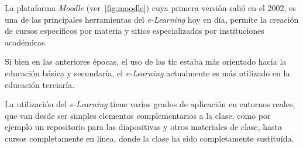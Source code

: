 La plataforma \emph{Moodle} (ver~\ref{fig:moodle}) cuya primera versión salió en
el 2002, es una de las principales herramientas del \emph{e-Learning} hoy en
día, permite la creación de cursos específicos por materia y sitios
especializados por instituciones académicas\cite{perkins2006using}. 

Si bien en las anteriores épocas, el uso de las \Gls{tic} estaba más orientado
hacia la educación básica y secundaría, el \emph{e-Learning} actualmente es más
utilizado en la educación terciaría\cite{punie:ict}.

La utilización del \emph{e-Learning} tiene varios grados de aplicación en
entornos reales\cite{punie:ict}, que van desde ser simples elementos
complementarios a la clase, como por ejemplo un repositorio para las
diapositivas y otros materiales de clase, hasta cursos completamente en línea,
donde la clase ha sido completamente sustituída.

